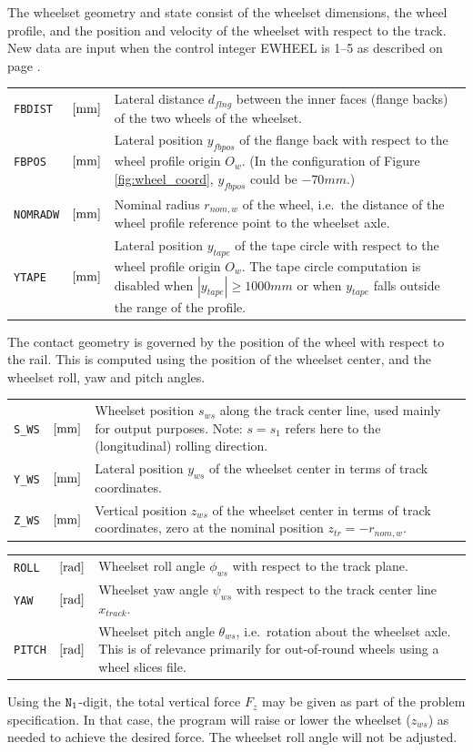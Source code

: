 \documentclass[12pt]{report}
\newenvironment{inputvars}{\vspace{0.4\baselineskip}%

\begin{tabular}{>{\raggedright}p{22mm}p{19mm}p{113mm}}}{
\end{tabular}

}
\newcommand{\inpvar}[3]{{\small\tt #1} & $#2$ & #3 \\[1ex]}
\newcommand{\inpbreak}{\end{inputvars}\begin{inputvars}}
\begin{document}
The wheelset geometry and state consist of the wheelset dimensions, the
wheel profile, and the position and velocity of the wheelset with respect
to the track. New data are input when the control integer EWHEEL is 1--5
as described on page \pageref{e1-digit}.
\begin{inputvars}
\inpvar{FBDIST}{\bunit{mm}}{Lateral distance $d_{flng}$ between the inner faces
        (flange backs) of the two wheels of the wheelset.}
\inpvar{FBPOS}{\bunit{mm}}{Lateral position $y_{fbpos}$ of the flange back with
        respect to the wheel profile origin $O_w$. (In the configuration of
        Figure \ref{fig:wheel_coord}, $y_{fbpos}$ could be $-70\unit{mm}$.)}
\inpvar{NOMRADW}{\bunit{mm}}{Nominal radius $r_{nom,w}$ of the wheel, i.e.\ the
        distance of the wheel profile reference point to the wheelset axle.}
\inpvar{YTAPE}{\bunit{mm}}{Lateral position $y_{tape}$ of the tape circle
        with respect to the wheel profile origin $O_w$. The tape circle
        computation is disabled when $|y_{tape}|\ge 1000\unit{mm}$ or
        when $y_{tape}$ falls outside the range of the profile.}
\end{inputvars}
The contact geometry is governed by the position of the wheel with respect
to the rail. This is computed using the position of the wheelset center,
and the wheelset roll, yaw and pitch angles.
\begin{inputvars}
\inpvar{S\_WS}{\bunit{mm}}{Wheelset position $s_{ws}$ along the track center
        line, used mainly for output purposes. Note: $s=s_1$ refers here to
        the (longitudinal) rolling direction.}
\inpvar{Y\_WS}{\bunit{mm}}{Lateral position $y_{ws}$ of the wheelset center 
        in terms of track coordinates.}
\inpvar{Z\_WS}{\bunit{mm}}{Vertical position $z_{ws}$ of the wheelset center
        in terms of track coordinates, zero at the nominal position
        $z_{tr}=-r_{nom,w}$.}
\inpbreak
\inpvar{ROLL}{\bunit{rad}}{Wheelset roll angle $\phi_{ws}$ with respect to the
        track plane.}
\inpvar{YAW}{\bunit{rad}}{Wheelset yaw angle $\psi_{ws}$ with respect to the
        track center line $x_{track}$.}
\inpvar{PITCH}{\bunit{rad}}{Wheelset pitch angle $\theta_{ws}$, i.e.\ rotation
        about the wheelset axle. This is of relevance primarily for
        out-of-round wheels using a wheel slices file.}
\end{inputvars}
Using the ${\tt N}_1$-digit, the total vertical force $F_z$ may be given as
part of the problem specification. In that case, the program will raise or
lower the wheelset ($z_{ws}$) as needed to achieve the desired force. The
wheelset roll angle will not be adjusted.
\end{document}
